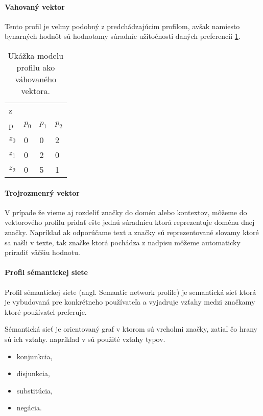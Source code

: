 \paragraph{Vahovaný vektor}

Tento profil je veľmy podobný z predchádzajúcim profilom, avšak namiesto bynarných 
hodnôt sú hodnotamy súradníc užitočnosti daných preferencií \ref{table:weightprofile}.

\begin{table}[h]
\begin{center}
\begin{tabular}{|l|l|l|l|}
\hline
z\\p  & \(p_0\) & \(p_1\) & \(p_2\) \\ \hline
\(z_0\) & 0     & 0        & 2        \\ \hline
\(z_1\) & 0     & 2        & 0        \\ \hline
\(z_2\) & 0     & 5        & 1        \\ \hline
\end{tabular}
\end{center}
\caption{Ukážka modelu profilu ako váhovaného vektora.}
\label{table:weightprofile}
\end{table}

\paragraph{Trojrozmenrý vektor}

V prípade že vieme aj rozdeliť značky do domén alebo kontextov,
môžeme do vektorového profilu pridať ešte jednú súradnicu ktorá reprezentuje
doménu dnej značky. Napríklad ak odporúčame text a značky sú
reprezentované slovamy ktoré sa našli v texte, tak značke ktorá pochádza 
z nadpisu môžeme automaticky priradiť väčšiu hodnotu.

\paragraph{Profil sémantickej siete}

Profil sémantickej siete (angl. Semantic network profile) je semantická sieť
ktorá je vybudovaná pre konkrétneho používateľa a vyjadruje vzťahy medzi značkamy
ktoré používateľ preferuje.


Sémantická sieť\cite{semantic_networks} je orientovaný graf v ktorom sú vrcholmi značky,
zatiaľ čo hrany sú ich vzťahy.
napríklad v \cite{basic_user_profiles} sú použité vzťahy typov.

\begin{itemize}
\item{konjunkcia,}
\item{disjunkcia,}
\item{substitúcia,}
\item{negácia.}
\end{itemize}

